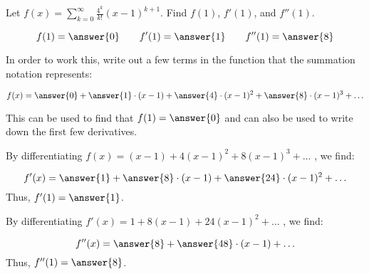 \documentclass{ximera}
\author{Jim Talamo}
\begin{document}
\begin{exercise}
Let $f(x) = \sum_{k=0}^{\infty} \frac{4^k}{k!}(x-1)^{k+1}$.  Find $f(1)$, $f'(1)$, and $f''(1)$.

\[
f(1) = \answer{0} \qquad f'(1) = \answer{1} \qquad f''(1) = \answer{8}
\]

\begin{hint}
In order to work this, write out a few terms in the function that the summation notation represents:

\[
f(x) = \answer{0}+\answer{1} \cdot (x-1)+\answer{4}  \cdot (x-1)^2+\answer{8}  \cdot (x-1)^3+ \ldots
\]

This can be used to find that $f(1) = \answer{0}$ and can also be used to write down the first few derivatives.

\begin{question}
By differentiating $f(x)=(x-1)+4(x-1)^2+8(x-1)^3+\ldots$ , we find:

\[
f'(x) = \answer{1}+\answer{8} \cdot (x-1)+\answer{24}  \cdot (x-1)^2+ \ldots
\]
Thus, $f'(1) = \answer{1}$.

\begin{question}
By differentiating $f'(x)=1+8(x-1)+24(x-1)^2+\ldots$ , we find:

\[
f''(x) = \answer{8}+\answer{48} \cdot (x-1)+ \ldots
\]
Thus, $f''(1) = \answer{8}$.

\end{question}
\end{question}



\end{hint}
\end{exercise}
\end{document}
